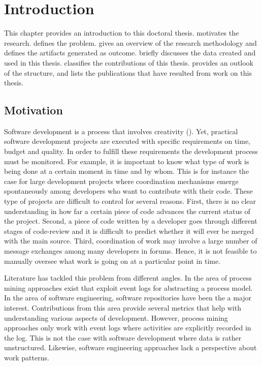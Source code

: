 \chapter{Introduction}
\label{chap:intro} %

This chapter provides an introduction to this doctoral thesis.  motivates the research.  defines the problem.  gives an overview of the research methodology and defines the artifacts generated as outcome.  briefly discusses the data created and used in this thesis.  classifies the contributions of this thesis.  provides an outlook of the structure, and  lists the publications that have resulted from work on this thesis. 

\section{Motivation}
\label{sec:intro-motivation}

Software development is a process that involves creativity (\citealp{DBLP:journals/jss/AldaveVGM19,DBLP:journals/jss/DingsoyrNBM12}). Yet, practical software development projects are executed with specific requirements on time, budget and quality. In order to fulfill these requirements the development process must be monitored. For example, it is important to know what type of work is being done at a certain moment in time and by whom. This is for instance the case for large development projects where coordination mechanisms emerge spontaneously among developers who want to contribute with their code.
These type of projects are difficult to control for several reasons. First, there is no clear understanding in how far a certain piece of code advances the current status of the project. Second, a piece of code written by a developer goes through different stages of code-review and it is difficult to predict whether it will ever be merged with the main source. Third, coordination of work may involve a large number of message exchanges among many developers in forums. Hence, it is not feasible to manually oversee what work is going on at a particular point in time. 

Literature has tackled this problem from different angles. In the area of process mining approaches exist that exploit event logs for abstracting a process model. In the area of software engineering, software repositories have been the a major interest. Contributions from this area provide several metrics that help with understanding various aspects of development. However, process mining approaches only work with event logs where activities are explicitly recorded in the log. This is not the case with software development where data is rather unstructured. Likewise, software engineering approaches lack a perspective about work patterns. 


